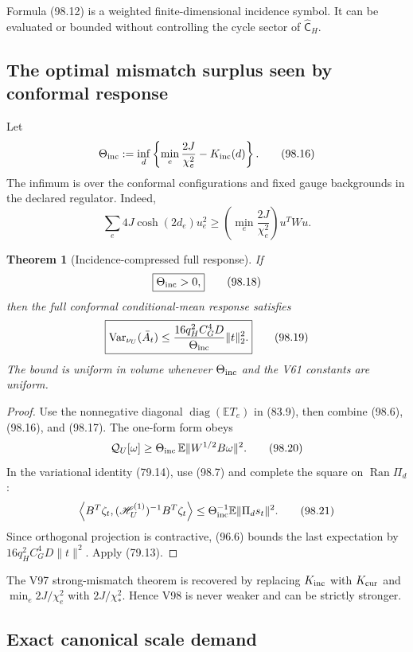 \documentclass[11pt]{article}
\newtheorem{theorem}{Theorem}[section]
\theoremstyle{remark}
\begin{document}
Formula (98.12) is a weighted finite-dimensional incidence symbol.  It
can be evaluated or bounded without controlling the cycle sector of
\(\widehat{\mathsf C}_H\).

\subsection{The optimal mismatch surplus seen by conformal response}

Let
\[
 \Theta_{\rm inc}
 :=\inf_d\left\{
 \min_e\frac{2J}{\chi_e^2}-K_{\rm inc}(d)
 \right\}.                                         \tag{98.16}
\]
The infimum is over the conformal configurations and fixed gauge
backgrounds in the declared regulator.  Indeed,
\[
 \sum_e4J\cosh(2d_e)u_e^2
 \geq\left(\min_e\frac{2J}{\chi_e^2}\right)u^TWu.  \tag{98.17}
\]

\begin{theorem}[Incidence-compressed full response]
\label{thm:v17v98-response}
If
\[
\boxed{\Theta_{\rm inc}>0,}                         \tag{98.18}
\]
then the full conformal conditional-mean response satisfies
\[
\boxed{
 \operatorname{Var}_{\nu_U}(\bar A_t)
 \leq\frac{16q_H^2C_G^4D}{\Theta_{\rm inc}}
       \|t\|_2^2.}                                  \tag{98.19}
\]
The bound is uniform in volume whenever \(\Theta_{\rm inc}\) and the
V61 constants are uniform.
\end{theorem}

\begin{proof}
Use the nonnegative diagonal
\(\operatorname{diag}(\mathbb ET_e)\) in (83.9), then combine
(98.6), (98.16), and (98.17).  The one-form form obeys
\[
 \mathcal Q_U[\omega]
 \geq\Theta_{\rm inc}\,
 \mathbb E\|W^{1/2}B\omega\|^2.                    \tag{98.20}
\]
In the variational identity (79.14), use (98.7) and complete the square
on \(\operatorname{Ran}\Pi_d\):
\[
 \left\langle B^T\zeta_t,
  (\mathscr H_U^{(1)})^{-1}B^T\zeta_t\right\rangle
 \leq\Theta_{\rm inc}^{-1}
       \mathbb E\|\Pi_ds_t\|^2.                    \tag{98.21}
\]
Since orthogonal projection is contractive, (96.6) bounds the last
expectation by
\(16q_H^2C_G^4D\|t\|^2\).  Apply (79.13).
\end{proof}

The V97 strong-mismatch theorem is recovered by replacing
\(K_{\rm inc}\) with \(K_{\rm cur}\) and
\(\min_e2J/\chi_e^2\) with \(2J/\chi_*^2\).  Hence V98 is never weaker
and can be strictly stronger.

\subsection{Exact canonical scale demand}
\end{document}
